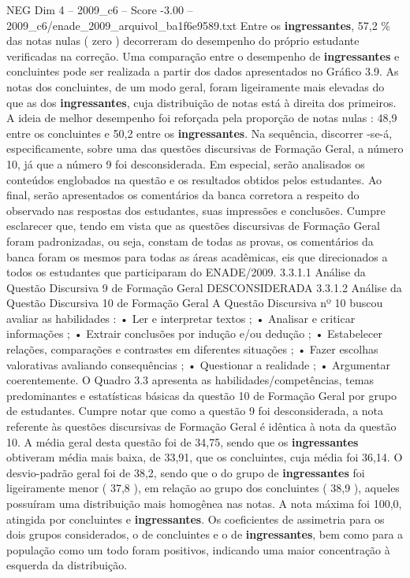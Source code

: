 \begin{textsample}{NEG Dim 4 – 2009\_c6 – Score -3.00 – 2009\_c6/enade\_2009\_arquivol\_ba1f6e9589.txt}
Entre os \textbf{ingressantes}, 57,2 \% das notas nulas ( zero ) decorreram do desempenho do próprio estudante verificadas na correção.
Uma comparação entre o desempenho de \textbf{ingressantes} e concluintes pode ser realizada a partir dos dados apresentados no Gráfico 3.9.
As notas dos concluintes, de um modo geral, foram ligeiramente mais elevadas do que as dos \textbf{ingressantes}, cuja distribuição de notas está à direita dos primeiros.
A ideia de melhor desempenho foi reforçada pela proporção de notas nulas : 48,9 entre os concluintes e 50,2 entre os \textbf{ingressantes}.
Na sequência, discorrer -se-á, especificamente, sobre uma das questões discursivas de Formação Geral, a número 10, já que a número 9 foi desconsiderada.
Em especial, serão analisados os conteúdos englobados na questão e os resultados obtidos pelos estudantes.
Ao final, serão apresentados os comentários da banca corretora a respeito do observado nas respostas dos estudantes, suas impressões e conclusões.
Cumpre esclarecer que, tendo em vista que as questões discursivas de Formação Geral foram padronizadas, ou seja, constam de todas as provas, os comentários da banca foram os mesmos para todas as áreas acadêmicas, eis que direcionados a todos os estudantes que participaram do ENADE/2009. 3.3.1.1 Análise da Questão Discursiva 9 de Formação Geral DESCONSIDERADA 3.3.1.2 Análise da Questão Discursiva 10 de Formação Geral A Questão Discursiva nº 10 buscou avaliar as habilidades : • Ler e interpretar textos ; • Analisar e criticar informações ; • Extrair conclusões por indução e/ou dedução ; • Estabelecer relações, comparações e contrastes em diferentes situações ; • Fazer escolhas valorativas avaliando consequências ; • Questionar a realidade ; • Argumentar coerentemente.
O Quadro 3.3 apresenta as habilidades/competências, temas predominantes e estatísticas básicas da questão 10 de Formação Geral por grupo de estudantes.
Cumpre notar que como a questão 9 foi desconsiderada, a nota referente às questões discursivas de Formação Geral é idêntica à nota da questão 10.
A média geral desta questão foi de 34,75, sendo que os \textbf{ingressantes} obtiveram média mais baixa, de 33,91, que os concluintes, cuja média foi 36,14.
O desvio-padrão geral foi de 38,2, sendo que o do grupo de \textbf{ingressantes} foi ligeiramente menor ( 37,8 ), em relação ao grupo dos concluintes ( 38,9 ), aqueles possuíram uma distribuição mais homogênea nas notas.
A nota máxima foi 100,0, atingida por concluintes e \textbf{ingressantes}.
Os coeficientes de assimetria para os dois grupos considerados, o de concluintes e o de \textbf{ingressantes}, bem como para a população como um todo foram positivos, indicando uma maior concentração à esquerda da distribuição.

\end{textsample}
